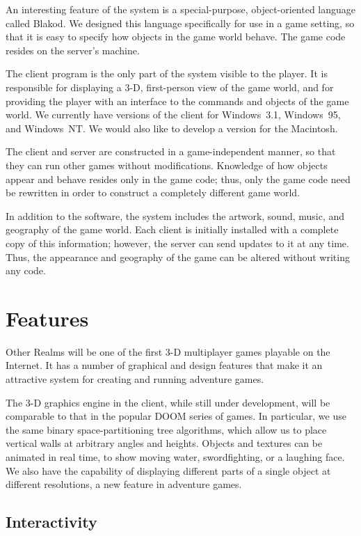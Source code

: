 \documentclass[12pt]{article}
\begin{document}
An interesting feature of the system is a special-purpose,
object-oriented language called Blakod.  We designed this language
specifically for use in a game setting, so that it is easy to specify
how objects in the game world behave.  The game code resides on the
server's machine.

The client program is the only part of the system visible to the
player.  It is responsible for displaying a 3-D, first-person view of
the game world, and for providing the player with an interface to the
commands and objects of the game world.  We currently have versions of
the client for Windows~3.1, Windows~95, and Windows~NT.  We would also
like to develop a version for the Macintosh.

The client and server are constructed in a game-independent manner, so
that they can run other games without modifications.  Knowledge of how
objects appear and behave resides only in the game code; thus, only
the game code need be rewritten in order to construct a completely
different game world.

In addition to the software, the system includes the artwork, sound,
music, and geography of the game world.  Each client is initially
installed with a complete copy of this information; however, the
server can send updates to it at any time.  Thus, the appearance and
geography of the game can be altered without writing any code.

\section{Features}

Other Realms will be one of the first 3-D multiplayer games playable
on the Internet.  It has a number of graphical and design features
that make it an attractive system for creating and running adventure
games.

The 3-D graphics engine in the client, while still under development,
will be comparable to that in the popular DOOM series of games.  In
particular, we use the same binary space-partitioning tree algorithms,
which allow us to place vertical walls at arbitrary angles and
heights.  Objects and textures can be animated in real time, to show
moving water, swordfighting, or a laughing face.  We also have the
capability of displaying different parts of a single object at different
resolutions, a new feature in adventure games.

\subsection{Interactivity}
\end{document}
